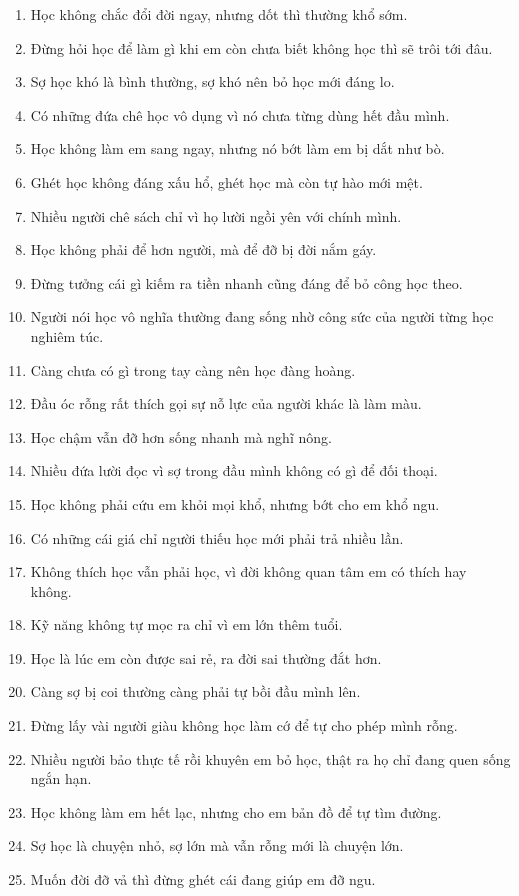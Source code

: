 \begin{enumerate}[leftmargin=*]
\item Học không chắc đổi đời ngay, nhưng dốt thì thường khổ sớm.
\item Đừng hỏi học để làm gì khi em còn chưa biết không học thì sẽ trôi tới đâu.
\item Sợ học khó là bình thường, sợ khó nên bỏ học mới đáng lo.
\item Có những đứa chê học vô dụng vì nó chưa từng dùng hết đầu mình.
\item Học không làm em sang ngay, nhưng nó bớt làm em bị dắt như bò.
\item Ghét học không đáng xấu hổ, ghét học mà còn tự hào mới mệt.
\item Nhiều người chê sách chỉ vì họ lười ngồi yên với chính mình.
\item Học không phải để hơn người, mà để đỡ bị đời nắm gáy.
\item Đừng tưởng cái gì kiếm ra tiền nhanh cũng đáng để bỏ công học theo.
\item Người nói học vô nghĩa thường đang sống nhờ công sức của người từng học nghiêm túc.
\item Càng chưa có gì trong tay càng nên học đàng hoàng.
\item Đầu óc rỗng rất thích gọi sự nỗ lực của người khác là làm màu.
\item Học chậm vẫn đỡ hơn sống nhanh mà nghĩ nông.
\item Nhiều đứa lười đọc vì sợ trong đầu mình không có gì để đối thoại.
\item Học không phải cứu em khỏi mọi khổ, nhưng bớt cho em khổ ngu.
\item Có những cái giá chỉ người thiếu học mới phải trả nhiều lần.
\item Không thích học vẫn phải học, vì đời không quan tâm em có thích hay không.
\item Kỹ năng không tự mọc ra chỉ vì em lớn thêm tuổi.
\item Học là lúc em còn được sai rẻ, ra đời sai thường đắt hơn.
\item Càng sợ bị coi thường càng phải tự bồi đầu mình lên.
\item Đừng lấy vài người giàu không học làm cớ để tự cho phép mình rỗng.
\item Nhiều người bảo thực tế rồi khuyên em bỏ học, thật ra họ chỉ đang quen sống ngắn hạn.
\item Học không làm em hết lạc, nhưng cho em bản đồ để tự tìm đường.
\item Sợ học là chuyện nhỏ, sợ lớn mà vẫn rỗng mới là chuyện lớn.
\item Muốn đời đỡ vả thì đừng ghét cái đang giúp em đỡ ngu.
\end{enumerate}

